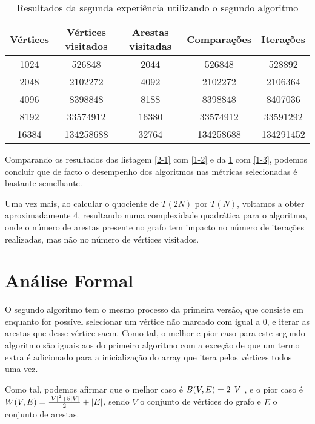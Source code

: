 \begin{table}[H]
	\centering
	\begin{tabular}{| c || c | c | c | c |}
		\hline
		Vértices & Vértices visitados & Arestas visitadas & Comparações & Iterações \\
		\hline\hline
		1024     & 526848             & 2044              & 526848      & 528892    \\
		2048     & 2102272            & 4092              & 2102272     & 2106364   \\
		4096     & 8398848            & 8188              & 8398848     & 8407036   \\
		8192     & 33574912           & 16380             & 33574912    & 33591292  \\
		16384    & 134258688          & 32764             & 134258688   & 134291452 \\
		\hline
	\end{tabular}
	\caption{Resultados da segunda experiência utilizando o segundo algoritmo}
	\label{2-2}
\end{table}

Comparando os resultados das listagem \ref{2-1} com \ref{1-2} e da \ref{2-2} com
\ref{1-3}, podemos concluir que de facto o desempenho dos algoritmos nas
métricas selecionadas é bastante semelhante.

Uma vez mais, ao calcular o quociente de $T(2N)$ por $T(N)$, voltamos a obter
aproximadamente 4, resultando numa complexidade quadrática para o algoritmo,
onde o número de arestas presente no grafo tem impacto no número de iterações
realizadas, mas não no número de vértices visitados.

\section{Análise Formal}

O segundo algoritmo tem o mesmo processo da primeira versão, que consiste em
enquanto for possível selecionar um vértice não marcado com 
igual a 0, e iterar as arestas que desse vértice saem. Como tal, o melhor e pior
caso para este segundo algoritmo são iguais aos do primeiro algoritmo com a
exceção de que um termo extra é adicionado para a inicialização do array que
itera pelos vértices todos uma vez.

Como tal, podemos afirmar que o melhor caso é $B(V, E) = 2\left\lvert V \right\rvert$, e o pior
caso é $W(V,E) = \frac{\left\lvert V \right\rvert^2 + 5\left\lvert V \right\rvert}{2} + \left\lvert E \right\rvert$, sendo $V$ o
conjunto de vértices do grafo e $E$ o conjunto de arestas. \\
